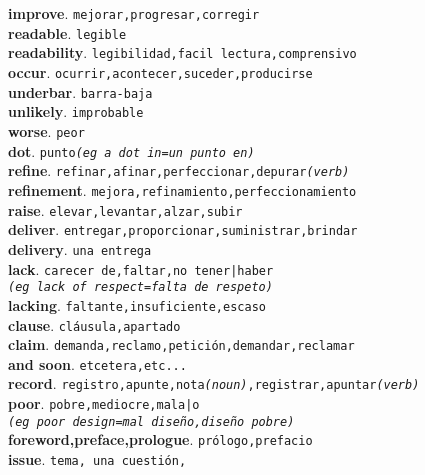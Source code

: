 \documentclass[twocolumn]{article}
\begin{document}
	\textsf{\textbf{improve}}. \texttt{mejorar,progresar,corregir}\\
	\textsf{\textbf{readable}}. \texttt{legible}\\
	\textsf{\textbf{readability}}. \texttt{legibilidad,facil lectura,comprensivo}\\
	\textsf{\textbf{occur}}. \texttt{ocurrir,acontecer,suceder,producirse}\\
	\textsf{\textbf{underbar}}. \texttt{barra-baja}\\
	\textsf{\textbf{unlikely}}. \texttt{improbable}\\
	\textsf{\textbf{worse}}. \texttt{peor}\\
	\textsf{\textbf{dot}}. \texttt{punto{\scriptsize \textsl{(eg a dot in=un punto en)}}}\\
	\textsf{\textbf{refine}}. \texttt{refinar,afinar,perfeccionar,depurar{\scriptsize \textsl{(verb)}}}\\
	\textsf{\textbf{refinement}}. \texttt{mejora,refinamiento,perfeccionamiento}\\
	\textsf{\textbf{raise}}. \texttt{elevar,levantar,alzar,subir}\\
	\textsf{\textbf{deliver}}. \texttt{entregar,proporcionar,suministrar,brindar}\\
	\textsf{\textbf{delivery}}. \texttt{una entrega}\\
	\textsf{\textbf{lack}}. \texttt{carecer de,faltar,no tener|haber\\{\scriptsize \textsl{(eg lack of respect=falta de respeto)}}}\\
	\textsf{\textbf{lacking}}. \texttt{faltante,insuficiente,escaso}\\
	\textsf{\textbf{clause}}. \texttt{cl\'ausula,apartado}\\
	\textsf{\textbf{claim}}. \texttt{demanda,reclamo,petici\'on,demandar,reclamar}\\
	\textsf{\textbf{and soon}}. \texttt{etcetera,etc...}\\
	\textsf{\textbf{record}}. \texttt{registro,apunte,nota{\scriptsize \textsl{(noun)}},registrar,apuntar{\scriptsize \textsl{(verb)}}}\\
	\textsf{\textbf{poor}}. \texttt{pobre,mediocre,mala|o\\{\scriptsize \textsl{(eg poor design=mal dise\~no,dise\~no pobre)}}}\\
	\textsf{\textbf{foreword,preface,prologue}}. \texttt{pr\'ologo,prefacio}\\
	\textsf{\textbf{issue}}. \texttt{tema, una cuesti\'on,}\\
\end{document}
